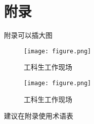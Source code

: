 
\setcounter{secnumdepth}{-1}
%
\appendix
\chapter{附录}
\par 附录可以插大图
\begin{figure}[htbp]
  \centering
  \texttt{[image: figure.png]}
  \caption{工科生工作现场}
  \label{fig:demo1}
\end{figure}
\newpage
\begin{figure}[htbp]
  \centering
  \texttt{[image: figure.png]}
  \caption{工科生工作现场}
  \label{fig:demo2}
\end{figure}
\newpage
\par 建议在附录使用术语表
